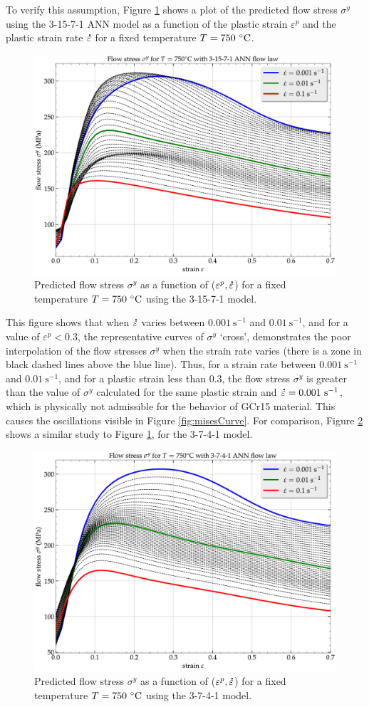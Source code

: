 \documentclass[algorithms,article,submit,pdftex,moreauthors]{Definitions/mdpi}
\DeclareRobustCommand{\mdot}[1]{\accentset{\mbox{\bfseries .}}{#1}}
\DeclareRobustCommand{\ps}{\text{s}^{-1}}
\begin{document}
To verify this assumption, Figure \ref{fig:ShapeOF1} shows a plot of the predicted flow stress $\sigma^y$ using the 3-15-7-1 ANN model as a function of the plastic strain $\varepsilon^p$ and the plastic strain rate $\mdot\varepsilon$ for a fixed temperature $T=750~\celsius$.
\begin{figure}[!ht]
\centering
\includegraphics[width=0.75\columnwidth]{Figures/Shape-3-15-7-1}
\caption{Predicted flow stress $\sigma^y$ as a function of ($\varepsilon^p, \mdot\varepsilon$) for a fixed temperature $T=750~\celsius$ using the 3-15-7-1 model.}
\label{fig:ShapeOF1}
\end{figure}
This figure shows that when $\mdot\varepsilon$ varies between $0.001~\ps$ and $0.01~\ps$, and for a value of $\varepsilon^p<0.3$, the representative curves of $\sigma^y$ ‘cross’, demonstrates the poor interpolation of the flow stresses $\sigma^y$ when the strain rate varies (there is a zone in black dashed lines above the blue line).
Thus, for a strain rate between $0.001~\ps$ and $0.01~\ps$, and for a plastic strain less than $0.3$, the flow stress $\sigma^y$ is greater than the value of $\sigma^y$ calculated for the same plastic strain and $\mdot\varepsilon=0.001~\ps$, which is physically not admissible for the behavior of GCr15 material.
This causes the oscillations visible in Figure \ref{fig:misesCurve}.
For comparison, Figure \ref{fig:ShapeOF2} shows a similar study to Figure \ref{fig:ShapeOF1}, for the 3-7-4-1 model.
\begin{figure}[!ht]
\centering
\includegraphics[width=0.75\columnwidth]{Figures/Shape-3-7-4-1}
\caption{Predicted flow stress $\sigma^y$ as a function of ($\varepsilon^p, \mdot\varepsilon$) for a fixed temperature $T=750~\celsius$ using the 3-7-4-1 model.}
\label{fig:ShapeOF2}
\end{figure}
\end{document}
